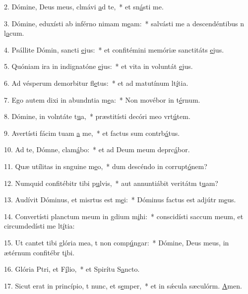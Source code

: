 2. Dómine, Deus meus, clmávi \uline{a}d te,~* et sn\uline{á}sti me.\par 
3. Dómine, eduxísti ab inférno nimam m\uline{e}am:~* salvásti me a descendéntibus n l\uline{a}cum.\par 
4. Psállite Dómin, sancti \uline{e}jus:~* et confitémini memóriæ sanctitáts \uline{e}jus.\par 
5. Quóniam ira in indignatóne \uline{e}jus:~* et vita in voluntát \uline{e}jus.\par 
6. Ad vésperum demorbitur fl\uline{e}tus:~* et ad matutínum lt\uline{í}tia.\par 
7. Ego autem dixi in abundntia m\uline{e}a:~* Non movébor in t\uline{é}rnum.\par 
8. Dómine, in volntáte t\uline{u}a,~* præstitísti decóri meo vrt\uline{ú}tem.\par 
9. Avertísti fácim tuam \uline{a} me,~* et factus sum contrb\uline{á}tus.\par 
10. Ad te, Dómne, clam\uline{á}bo:~* et ad Deum meum deprc\uline{á}bor.\par 
11. Quæ utílitas in snguine m\uline{e}o,~* dum descéndo in corrupt\uline{ó}nem?\par 
12. Numquid confitébitr tibi p\uline{u}lvis,~* aut annuntiábit veritátm t\uline{u}am?\par 
13. Audívit Dóminus, et misrtus est m\uline{e}i:~* Dóminus factus est adjútr m\uline{e}us.\par 
14. Convertísti planctum meum in gdium m\uline{i}hi:~* conscidísti saccum meum, et circumdedísti me lt\uline{í}tia:\par 
15. Ut cantet tibi glória mea, t non comp\uline{ú}ngar:~* Dómine, Deus meus, in ætérnum confitébr t\uline{i}bi.\par 
16. Glória Ptri, et F\uline{í}lio,~* et Spirítu S\uline{a}ncto.\par 
17. Sicut erat in princípio, t nunc, et s\uline{e}mper,~* et in sǽcula sæculórm. \uline{A}men.\par 
